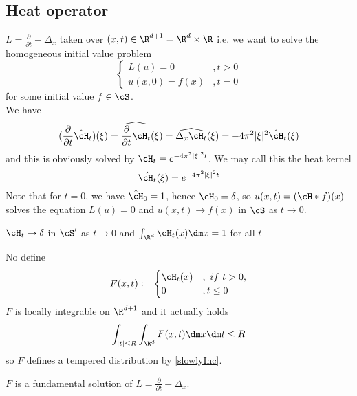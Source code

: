 	\subsection{Heat operator}
	$L = \frac{\partial}{\partial t} - \Delta_x$
	taken over $(x,t) \in \R^{d+1} = \R^d \times \R$
	i.e. we want to solve the homogeneous initial value problem
	\[
	\begin{cases}
		L (u) = 0 & , t > 0 \\
		u(x,0) = f(x) & , t = 0
	\end{cases}
	\]
	for some initial value $f \in \cS$. \\
	We have 
	\[
	(\frac{\partial}{\partial t} \hat \cH_t)(\xi) = \widehat{\frac{\partial}{\partial t} \cH_t}(\xi) = \widehat{\Delta_x \cH_t}(\xi) = -4\pi^2 |\xi|^2 \hat \cH_t (\xi)
	\]
	and this is obviously solved by $\cH_t = e^{-4\pi^2 |\xi|^2 t}$. We may call this the heat kernel
	\[
	\hat{\cH_t}(\xi) = e^{-4\pi^2 |\xi|^2 t}
	\]
	Note that for $t = 0$, we have $\hat \cH_0 = 1$, hence $\cH_0  = \delta$, so $u(x,t) = (\cH * f)(x)$ solves the equation $L(u) = 0$ and $u(x,t) \to f(x)$ in $\cS$ as $t \to 0$. 
	\begin{rmk}{\label{rmk:approxId}}
		$\cH_t \to \delta$ in $\cS'$ as $t \to 0$ and $\int_{\R^d} \cH_t(x) \dm x = 1$ for all $t$
	\end{rmk}
	No define 
	\[
	F(x,t) := \begin{cases}
		\cH_t(x) & , \ if  \ t > 0 , \\
		0 & , t \le 0 
	\end{cases}
	\]
	$F$ is locally integrable on $\R^{d+1}$ and it actually holds 
	\[
	\int_{|t|\le R} \int_{\R^d} F(x,t) \dm x \dm t \le R
	\]
	so $F$ defines a tempered distribution by \ref{slowlyInc}.
	\begin{theorem}
		$F$ is a fundamental solution of $L =  \frac{\partial}{\partial t} - \Delta_x$.
	\end{theorem}
